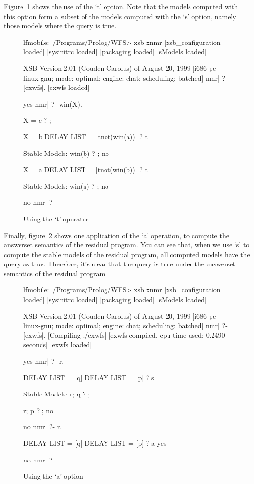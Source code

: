 \documentclass{article}
\begin{document}
Figure~\ref{fig:tstable} shows the use of the `t' option. Note that
the models computed with this option form a subset of the models
computed with the `s' option, namely those models where the query is
true.

\begin{figure}
\label{fig:tstable}
\centering
\scriptsize
\begin{boxedverbatim}
lfmobile:~/Programs/Prolog/WFS> xsb xnmr
[xsb_configuration loaded]
[sysinitrc loaded]
[packaging loaded]
[sModels loaded]

XSB Version 2.01 (Gouden Carolus) of August 20, 1999
[i686-pc-linux-gnu; mode: optimal; engine: chat; scheduling: batched]
nmr| ?- [exwfs].
[exwfs loaded]

yes
nmr| ?- win(X).

X = c ? ;

X = b
DELAY LIST = [tnot(win(a))] ? t

Stable Models: 
  {win(b)} ? ;
  no

X = a
DELAY LIST = [tnot(win(b))] ? t

Stable Models: 
  {win(a)} ? ;
  no

no
nmr| ?- 
\end{boxedverbatim}
\caption{Using the `t' operator}
\end{figure}

Finally, figure~\ref{fig:answerset} shows one application of the `a'
operation, to compute the answerset semantics of the residual
program. You can see that, when we use `s' to compute the stable
models of the residual program, all computed models have the query as
true. Therefore, it's clear that the query is true under the answerset
semantics of the residual program. 

\begin{figure}
\label{fig:answerset}
\centering
\scriptsize
\begin{boxedverbatim}
lfmobile:~/Programs/Prolog/WFS> xsb xnmr
[xsb_configuration loaded]
[sysinitrc loaded]
[packaging loaded]
[sModels loaded]

XSB Version 2.01 (Gouden Carolus) of August 20, 1999
[i686-pc-linux-gnu; mode: optimal; engine: chat; scheduling: batched]
nmr| ?- [exwfs].
[Compiling ./exwfs]
[exwfs compiled, cpu time used: 0.2490 seconds]
[exwfs loaded]

yes
nmr| ?- r.

DELAY LIST = [q]
DELAY LIST = [p] ? s

Stable Models: 
  {r; q} ? ;

  {r; p} ? ;
  no

no
nmr| ?- r.

DELAY LIST = [q]
DELAY LIST = [p] ? a
  yes

no
nmr| ?- 
\end{boxedverbatim}
\caption{Using the `a' option}
\end{figure}
\end{document}

